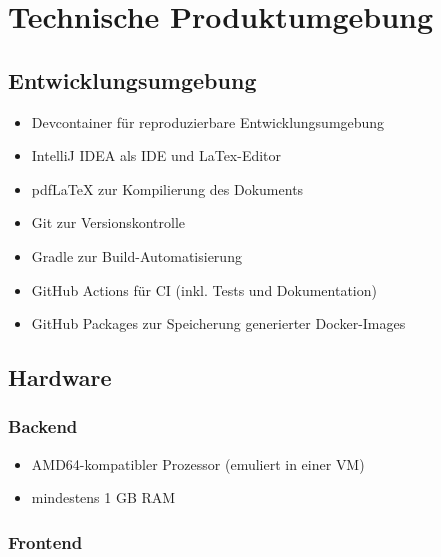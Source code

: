 

\chapter{Technische Produktumgebung}
\label{chap:tech_env}

\section{Entwicklungsumgebung}

\begin{itemize}
    \item \gls{Devcontainer} für reproduzierbare Entwicklungsumgebung
    \item IntelliJ IDEA als \gls{IDE} und LaTex-Editor
    \item pdfLaTeX zur Kompilierung des Dokuments
    \item \gls{Git} zur Versionskontrolle
    \item \gls{Gradle} zur Build-Automatisierung
    \item \gls{GitHub} Actions für \gls{CI} (inkl. Tests und Dokumentation)
    \item \gls{GitHub} Packages zur Speicherung generierter \gls{Docker}-Images
\end{itemize}

\section{Hardware}

\subsection{Backend}

\begin{itemize}
    \item \gls{AMD64}-kompatibler Prozessor (emuliert in einer \gls{VM})
    \item mindestens 1 GB \gls{RAM}
\end{itemize}

\subsection{Frontend}

